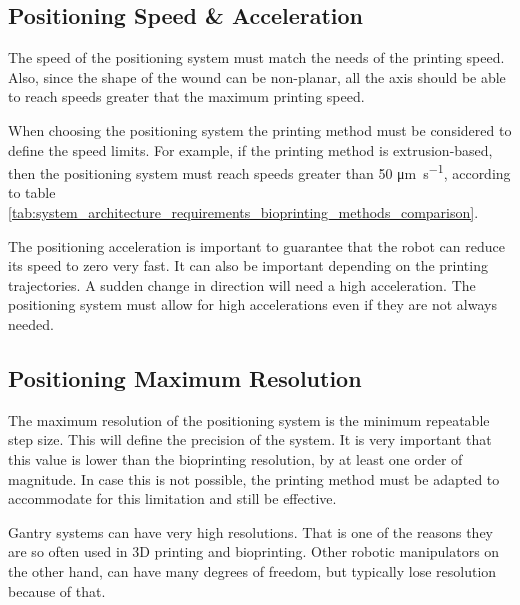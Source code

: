 
\subsection{Positioning Speed \& Acceleration}
\label{subsec:system_architecture_requirements_positioning_speed_acceleration}

The speed of the positioning system must match the needs of the printing speed. Also, since the shape of the wound can be non-planar, all the axis should be able to reach speeds greater that the maximum printing speed.

When choosing the positioning system the printing method must be considered to define the speed limits. For example, if the printing method is extrusion-based, then the positioning system must reach speeds greater than 50 \si{\micro\meter\per\second}, according to table \ref{tab:system_architecture_requirements_bioprinting_methods_comparison}.

The positioning acceleration is important to guarantee that the robot can reduce its speed to zero very fast. It can also be important depending on the printing trajectories. A sudden change in direction will need a high acceleration. The positioning system must allow for high accelerations even if they are not always needed.


\subsection{Positioning Maximum Resolution}
\label{subsec:system_architecture_requirements_positioning_max_resolution}

The maximum resolution of the positioning system is the minimum repeatable step size. This will define the precision of the system. It is very important that this value is lower than the bioprinting resolution, by at least one order of magnitude. In case this is not possible, the printing method must be adapted to accommodate for this limitation and still be effective.

Gantry systems can have very high resolutions. That is one of the reasons they are so often used in 3D printing and bioprinting. Other robotic manipulators on the other hand, can have many degrees of freedom, but typically lose resolution because of that.

